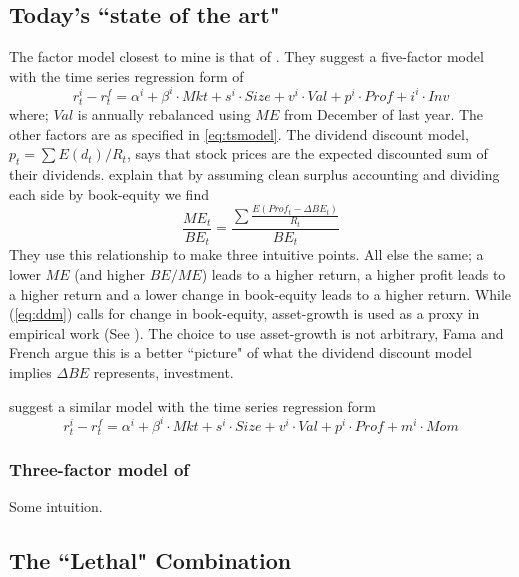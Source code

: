 \subsection{Today's ``state of the art"}

The factor model closest to mine is that of \textcite{fama2016choosing}.
They suggest a five-factor model with the time series regression form of
\begin{equation}
\label{eq:tsFF2016}
r_t^i - r_t^f= \alpha^i + \beta^i \cdot Mkt + s^i \cdot Size + v^i \cdot Val + p^i \cdot Prof 
+ i^i \cdot Inv
\end{equation}
where; $Val$ is annually rebalanced using $ME$ from December of last year.
The other factors are as specified in \ref{eq:tsmodel}.
The dividend discount model, $p_t = \sum E(d_t)/R_t$, says that stock prices are the expected 
discounted sum of their dividends.
\textcite{fama2006profitability} explain that by assuming clean surplus accounting and 
dividing each side by book-equity we find
\begin{equation}
\label{eq:ddm}
\frac{ME_t}{BE_t} = \frac{\sum \frac{E(Prof_t-\Delta BE_t)}{R_t}}{BE_t}
\end{equation}
They use this relationship to make three intuitive points.
All else the same;
a lower $ME$ (and higher $BE/ME$) leads to a higher return,
a higher profit leads to a higher return and
a lower change in book-equity leads to a higher return.
While (\ref{eq:ddm}) calls for change in book-equity, asset-growth is used as a proxy in 
empirical work (See \textcite{fama2015five, fama2016choosing, fama2017international}).
The choice to use asset-growth is not arbitrary, Fama and French argue this is a better 
``picture" of what the dividend discount model implies $\Delta BE$ represents, 
investment.

\textcite{ball2016accruals} suggest a similar model with the time series regression form
\begin{equation}
\label{eq:tsBall2016}
r_t^i - r_t^f= \alpha^i + \beta^i \cdot Mkt + s^i \cdot Size + v^i \cdot Val + p^i \cdot Prof 
+ m^i \cdot Mom
\end{equation}

\subsubsection{Three-factor model of \textcite{fama1993common}}

Some intuition.


\subsection{The ``Lethal" Combination}

